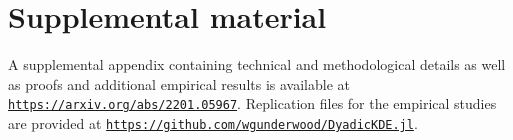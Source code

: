 \section*{Supplemental material}

A supplemental appendix containing technical and methodological details
as well as proofs and additional empirical results is available at
\href{https://arxiv.org/abs/2201.05967}%
{\texttt{https://arxiv.org/abs/2201.05967}}.
Replication files for the empirical studies are provided at
\href{https://github.com/WGUNDERWOOD/DyadicKDE.jl}%
{\texttt{https://github.com/wgunderwood/DyadicKDE.jl}}.
